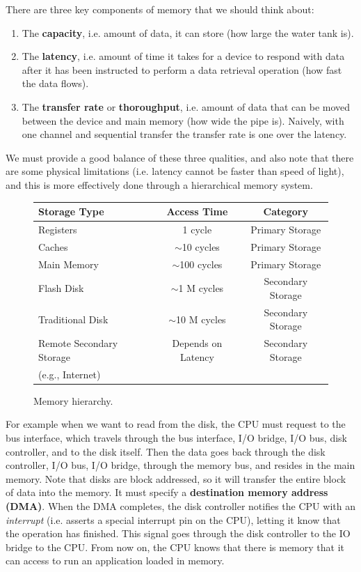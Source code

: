   There are three key components of memory that we should think about: 
  \begin{enumerate}
    \item The \textbf{capacity}, i.e. amount of data, it can store (how large the water tank is). 
    \item The \textbf{latency}, i.e. amount of time it takes for a device to respond with data after it has been instructed to perform a data retrieval operation (how fast the data flows). 
    \item The \textbf{transfer rate} or \textbf{thoroughput}, i.e. amount of data that can be moved between the device and main memory (how wide the pipe is). Naively, with one channel and sequential transfer the transfer rate is one over the latency. 
  \end{enumerate}

  We must provide a good balance of these three qualities, and also note that there are some physical limitations (i.e. latency cannot be faster than speed of light), and this is more effectively done through a hierarchical memory system.

  \begin{figure}[H]
    \centering 
    \begin{tabular}{|l|c|c|}
      \hline
      \textbf{Storage Type} & \textbf{Access Time} & \textbf{Category} \\
      \hline
      Registers & 1 cycle & Primary Storage \\
      \hline
      Caches & $\sim$10 cycles & Primary Storage \\
      \hline
      Main Memory & $\sim$100 cycles & Primary Storage \\
      \hline
      Flash Disk & $\sim$1 M cycles & Secondary Storage \\
      \hline
      Traditional Disk & $\sim$10 M cycles & Secondary Storage \\
      \hline
      Remote Secondary Storage & Depends on Latency & Secondary Storage \\
      (e.g., Internet) & & \\
      \hline
    \end{tabular}
    \caption{Memory hierarchy.} 
    \label{fig:memory_hierarchy}
  \end{figure}

  For example when we want to read from the disk, the CPU must request to the bus interface, which travels through the bus interface, I/O bridge, I/O bus, disk controller, and to the disk itself. Then the data goes back through the disk controller, I/O bus, I/O bridge, through the memory bus, and resides in the main memory. Note that disks are block addressed, so it will transfer the entire block of data into the memory. It must specify a \textbf{destination memory address (DMA)}. When the DMA completes, the disk controller notifies the CPU with an \textit{interrupt} (i.e. asserts a special interrupt pin on the CPU), letting it know that the operation has finished. This signal goes through the disk controller to the IO bridge to the CPU. From now on, the CPU knows that there is memory that it can access to run an application loaded in memory. 

